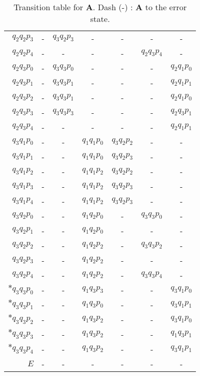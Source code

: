 \begin{table}[H]
\begin{tabular}{|r|cccccc|}
 $q_2 q_2 p_3$ & - & $q_3 q_2 p_3$ & - & - & - & - \\
 $q_2 q_2 p_4$ & - & - & - & - & $q_2 q_3 p_4$ & - \\ \hline
 $q_2 q_3 p_0$ & - & $q_3 q_3 p_0$ & - & - & - & $q_2 q_1 p_0$ \\
 $q_2 q_3 p_1$ & - & $q_3 q_3 p_1$ & - & - & - & $q_2 q_1 p_1$ \\
 $q_2 q_3 p_2$ & - & $q_3 q_3 p_1$ & - & - & - & $q_2 q_1 p_0$ \\
 $q_2 q_3 p_3$ & - & $q_3 q_3 p_3$ & - & - & - & $q_2 q_3 p_1$ \\
 $q_2 q_3 p_4$ & - & - & - & - & - & $q_2 q_1 p_1$ \\ \hline
 $q_3 q_1 p_0$ & - & - & $q_1 q_1 p_0$ & $q_3 q_2 p_2$ & - & - \\
 $q_3 q_1 p_1$ & - & - & $q_1 q_1 p_0$ & $q_3 q_2 p_3$ & - & - \\
 $q_3 q_1 p_2$ & - & - & $q_1 q_1 p_2$ & $q_3 q_2 p_2$ & - & - \\
 $q_3 q_1 p_3$ & - & - & $q_1 q_1 p_2$ & $q_3 q_2 p_3$ & - & - \\
 $q_3 q_1 p_4$ & - & - & $q_1 q_1 p_2$ & $q_3 q_2 p_3$ & - & - \\ \hline
 $q_3 q_2 p_0$ & - & - & $q_1 q_2 p_0$ & - & $q_3 q_3 p_0$ & - \\
 $q_3 q_2 p_1$ & - & - & $q_1 q_2 p_0$ & - & - & - \\
 $q_3 q_2 p_2$ & - & - & $q_1 q_2 p_2$ & - & $q_3 q_3 p_2$ & - \\
 $q_3 q_2 p_3$ & - & - & $q_1 q_2 p_2$ & - & - & - \\
 $q_3 q_2 p_4$ & - & - & $q_1 q_2 p_2$ & - & $q_3 q_3 p_4$ & - \\ \hline
 $*q_3 q_3 p_0$ & - & - & $q_1 q_3 p_3$ & - & - & $q_3 q_1 p_0$ \\
 $*q_3 q_3 p_1$ & - & - & $q_1 q_3 p_0$ & - & - & $q_3 q_1 p_1$ \\
 $*q_3 q_3 p_2$ & - & - & $q_1 q_3 p_2$ & - & - & $q_3 q_1 p_0$ \\
 $*q_3 q_3 p_3$ & - & - & $q_1 q_3 p_2$ & - & - & $q_1 q_3 p_1$ \\
 $*q_3 q_3 p_4$ & - & - & $q_1 q_3 p_2$ & - & - & $q_3 q_1 p_1$ \\ \hline
$E$     & - & - & - & - & - & - \\ \hline
 \end{tabular}
 \caption{Transition table for \textbf{A}. Dash (-) : \textbf{A} to the error state.}
 \label{tab:Atable}
\end{table}


